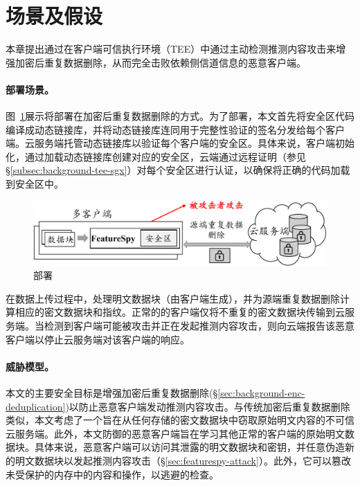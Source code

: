 \section{场景及假设}
\label{sec:featurespy-setting}

本章提出\sysnameF 通过在客户端可信执行环境（TEE）中通过主动检测推测内容攻击来增强加密后重复数据删除，从而完全击败依赖侧信道信息的恶意客户端。

\paragraph*{部署场景。}图~\ref{fig:featurespy-model}展示将\sysnameF 部署在加密后重复数据删除的方式。为了部署\sysnameF，本文首先将安全区代码编译成动态链接库\cite{sgx}，并将动态链接库连同用于完整性验证的签名分发给每个客户端。云服务端托管动态链接库以验证每个客户端的安全区。具体来说，客户端初始化\sysnameF，通过加载动态链接库创建对应的安全区，云端通过远程证明\cite{sgx}（参见\S\ref{subsec:background-tee-sgx}）对每个安全区进行认证，以确保将正确的代码加载到安全区中。

\begin{figure}
    \centering
    \includegraphics[width=\textwidth]{pic/featurespy/deployment.pdf}
    \caption{部署\sysnameF}
    \label{fig:featurespy-model}
\end{figure}

在数据上传过程中，\sysnameF 处理明文数据块（由客户端生成），并为源端重复数据删除计算相应的密文数据块和指纹。正常的的客户端仅将不重复的密文数据块传输到云服务端。当\sysnameF 检测到客户端可能被攻击并正在发起推测内容攻击，则向云端报告该恶意客户端以停止云服务端对该客户端的响应。

\paragraph*{威胁模型。}本文的主要安全目标是增强加密后重复数据删除(\S\ref{sec:background-enc-deduplication})以防止恶意客户端发动推测内容攻击。与传统加密后重复数据删除\cite{bellare2013MLE}类似，本文考虑了一个旨在从任何存储的密文数据块中窃取原始明文内容的不可信云服务端。此外，本文防御的恶意客户端旨在学习其他正常的客户端的原始明文数据块。具体来说，恶意客户端可以访问其泄露的明文数据块和密钥，并任意伪造新的明文数据块以发起推测内容攻击（\S\ref{sec:featurespy-attack}）。此外，它可以篡改未受保护的内存中的内容和操作，以逃避\sysnameF 的检查。


